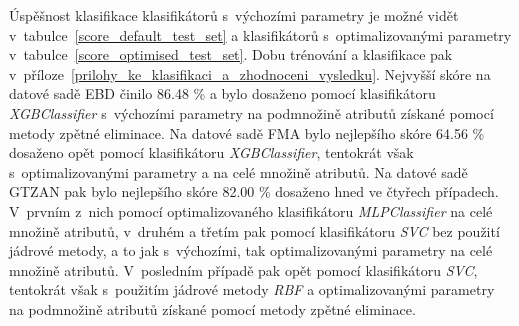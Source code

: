 Úspěšnost klasifikace klasifikátorů s~výchozími parametry je možné vidět v~tabulce~\ref{score_default_test_set} a klasifikátorů s~optimalizovanými parametry v~tabulce~\ref{score_optimised_test_set}. Dobu trénování a klasifikace pak v~příloze~\ref{prilohy_ke_klasifikaci_a_zhodnoceni_vysledku}. Nejvyšší skóre na datové sadě EBD činilo 86.48 \% a bylo dosaženo pomocí klasifikátoru \textit{XGBClassifier} s~výchozími parametry na podmnožině atributů získané pomocí metody zpětné eliminace. Na datové sadě FMA bylo nejlepšího skóre 64.56 \% dosaženo opět pomocí klasifikátoru \textit{XGBClassifier}, tentokrát však s~optimalizovanými parametry a na celé množině atributů. Na datové sadě GTZAN pak bylo nejlepšího skóre 82.00 \% dosaženo hned ve čtyřech případech. V~prvním z~nich pomocí optimalizovaného klasifikátoru \textit{MLPClassifier} na celé množině atributů, v~druhém a třetím pak pomocí klasifikátoru \textit{SVC} bez použití jádrové metody, a to jak s~výchozími, tak optimalizovanými parametry na celé množině atributů. V~posledním případě pak opět pomocí klasifikátoru \textit{SVC}, tentokrát však s~použitím jádrové metody \textit{RBF} a optimalizovanými parametry na podmnožině atributů získané pomocí metody zpětné eliminace.

